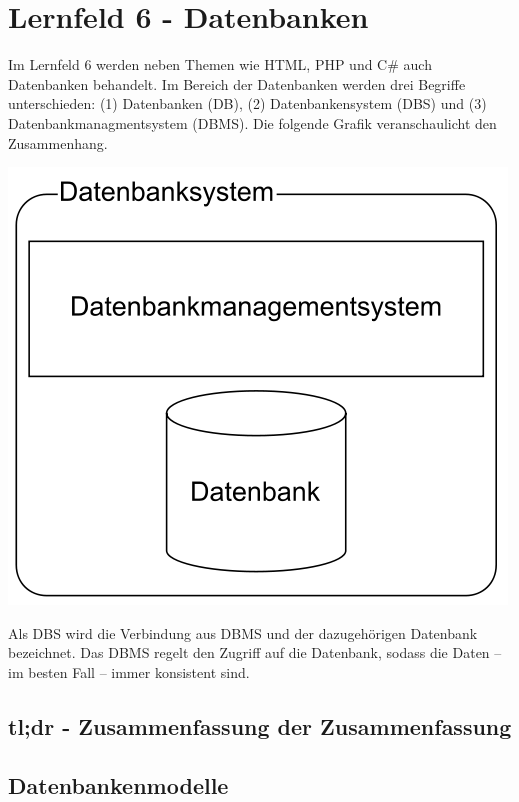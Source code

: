\section{Lernfeld 6 - Datenbanken}

Im Lernfeld 6 werden neben Themen wie HTML, PHP und C\# auch Datenbanken behandelt. Im Bereich der Datenbanken werden drei Begriffe unterschieden: (1) Datenbanken (DB), (2) Datenbankensystem (DBS) und (3) Datenbankmanagmentsystem (DBMS). Die folgende Grafik veranschaulicht den Zusammenhang.

\includegraphics[scale=0.4]{pictures/lf06db-pic/lf06db-begriffszusammenhang.png}

Als DBS wird die Verbindung aus DBMS und der dazugehörigen Datenbank bezeichnet. Das DBMS regelt den Zugriff auf die Datenbank, sodass die Daten -- im besten Fall -- immer konsistent sind. 

\subsection{tl;dr - Zusammenfassung der Zusammenfassung}


\subsection{Datenbankenmodelle}

